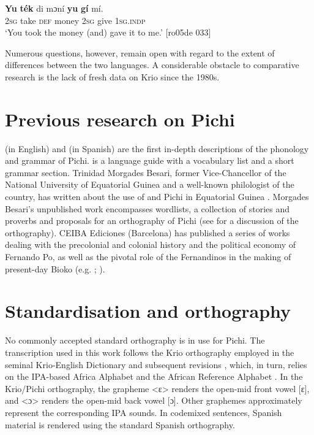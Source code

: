 \ea%
    \label{ex:1:21}
    \gll   \textbf{Yu}  \textbf{ték}    di  mɔní  \textbf{yu}  \textbf{gí}  mí.\\
\textsc{2sg}  take    \textsc{def}  money  \textsc{2sg}  give  \textsc{1sg.indp}\\

\glt ‘You took the money (and) gave it to me.’ [ro05de 033]
\z

Numerous questions, however, remain open with regard to the extent of differences between the two languages. A considerable obstacle to comparative research is the lack of fresh data on Krio since the 1980s.

\section{Previous research on Pichi}\label{sec:1.5}

\citealt{Yakpo2009a} (in English) and \citeyear{Yakpo2010} (in Spanish) are the first in-depth descriptions of the phonology and grammar of Pichi. \citet{Zarco1938} is a language guide with a vocabulary list and a short grammar section. Trinidad Morgades Besari, former Vice-Chancellor of the National University of Equatorial Guinea and a well-known philologist of the country, has written about the use of  and Pichi in Equatorial Guinea \citep{MorgadesBesari2005,MorgadesBesari2011}. Morgades Besari’s unpublished work encompasses wordlists, a collection of stories and proverbs and proposals for an orthography of Pichi (see \citealt{Yakpo2011} for a discussion of the orthography). CEIBA Ediciones (Barcelona) has published a series of works dealing with the precolonial and colonial history and the political economy of Fernando Po, as well as the pivotal role of the Fernandinos in the making of present-day Bioko (e.g. \citealt{MartindelMolino1993}; \citealt{Cantús2006}).

\section{Standardisation and orthography}\label{sec:1.6}

No commonly accepted standard orthography is in use for Pichi. The transcription used in this work follows the Krio orthography employed in the seminal Krio-English Dictionary \citep{FyleJones1980} and subsequent revisions \citep{Coomber1992}, which, in turn, relies on the IPA-based Africa Alphabet \citep{InternationalAfricanInstitute1930} and the African Reference Alphabet \citep{UNESCO1981}. In the Krio\slash Pichi orthography, the grapheme <ɛ> renders the open-mid front vowel [ɛ], and <ɔ> renders the open-mid back vowel [ɔ]. Other graphemes approximately represent the corresponding IPA sounds. In codemixed sentences, Spanish material is rendered using the standard Spanish orthography. 


